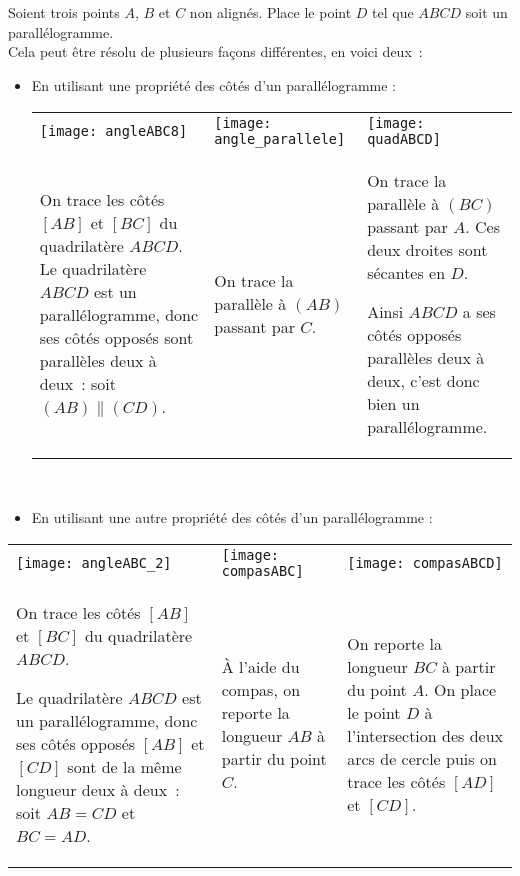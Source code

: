 \section{} %


\begin{methode*1}

\begin{exemple*1}
Soient trois points $A$, $B$ et $C$ non alignés. Place le point $D$ tel que $ABCD$ soit un parallélogramme.\\[0.5em]
Cela peut être résolu de plusieurs façons différentes, en voici deux :
\begin{itemize}
 \item En utilisant une propriété des côtés d'un parallélogramme :

\begin{tabularx}{\textwidth}{X|X|X}
 \qquad \texttt{[image: angleABC8]} & \texttt{[image: angle\_parallele]} & \texttt{[image: quadABCD]} \\ 
 On trace les côtés $[AB]$ et $[BC]$ du quadrilatère $ABCD$. Le quadrilatère $ABCD$ est un parallélogramme, donc ses côtés opposés sont parallèles deux à deux : soit $(AB) \parallel (CD)$. & On trace la parallèle à $(AB)$ passant par $C$. & On trace la parallèle à $(BC)$ passant par $A$. Ces deux droites sont sécantes en $D$.
 
 Ainsi $ABCD$ a ses côtés opposés parallèles deux à deux, c'est donc bien un parallélogramme. \\
\end{tabularx} \\[1em]

 \item En utilisant une autre propriété des côtés d'un parallélogramme :
 \end{itemize}
 
 \begin{tabularx}{\textwidth}{X|X|X}
 \qquad \texttt{[image: angleABC\_2]} & \qquad \texttt{[image: compasABC]} & \texttt{[image: compasABCD]}  \\ 
 On trace les côtés $[AB]$ et $[BC]$ du quadrilatère $ABCD$.
 
 Le quadrilatère $ABCD$ est un parallélogramme, donc ses côtés opposés $[AB]$ et $[CD]$ sont de la même longueur deux à deux : soit $AB = CD$ et $BC = AD$. & À l'aide du compas, on reporte la longueur $AB$ à partir du point $C$. & On reporte la longueur $BC$ à partir du point $A$. On place le point $D$ à l'intersection des deux arcs de cercle puis on trace les côtés $[AD]$ et $[CD]$.
 

\end{tabularx}
\end{exemple*1}
\end{methode*1}

